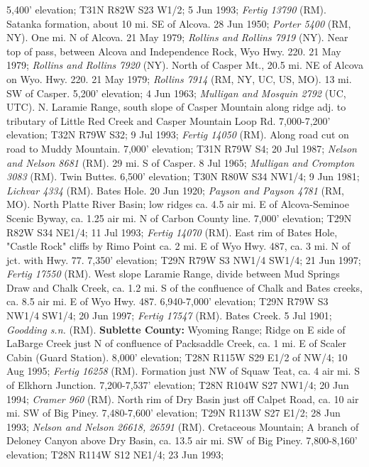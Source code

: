 5,400’ elevation; T31N R82W S23 W1/2; 5 Jun 1993; \textit{Fertig 13790} (RM).
Satanka formation, about 10 mi. SE of Alcova. 28 Jun 1950;
\textit{Porter 5400} (RM, NY).
One mi. N of Alcova. 21 May 1979; \textit{Rollins and Rollins 7919} (NY).
Near top of pass, between Alcova and Independence Rock, Wyo Hwy. 220.
21 May 1979; \textit{Rollins and Rollins 7920} (NY).
North of Casper Mt., 20.5 mi. NE of Alcova on Wyo. Hwy. 220. 21 May 1979;
\textit{Rollins 7914} (RM, NY, UC, US, MO).
13 mi. SW of Casper. 5,200’ elevation; 4 Jun 1963;
\textit{Mulligan and Mosquin 2792} (UC, UTC).
N. Laramie Range, south slope of Casper Mountain along ridge adj. to tributary
of Little Red Creek and Casper Mountain Loop Rd. 7,000-7,200’ elevation;
T32N R79W S32; 9 Jul 1993; \textit{Fertig 14050} (RM).
Along road cut on road to Muddy Mountain. 7,000’ elevation; T31N R79W S4;
20 Jul 1987; \textit{Nelson and Nelson 8681} (RM).
29 mi. S of Casper. 8 Jul 1965; \textit{Mulligan and Crompton 3083} (RM).
Twin Buttes. 6,500’ elevation; T30N R80W S34 NW1/4; 9 Jun 1981;
\textit{Lichvar 4334} (RM).
Bates Hole. 20 Jun 1920; \textit{Payson and Payson 4781} (RM, MO).
North Platte River Basin; low ridges ca. 4.5 air mi. E of Alcova-Seminoe Scenic
Byway, ca. 1.25 air mi. N of Carbon County line. 7,000’ elevation;
T29N R82W S34 NE1/4; 11 Jul 1993; \textit{Fertig 14070} (RM).
East rim of Bates Hole, "Castle Rock" cliffs by Rimo Point ca. 2 mi. E of Wyo
Hwy. 487, ca. 3 mi. N of jct. with Hwy. 77. 7,350’ elevation; T29N R79W S3
NW1/4 SW1/4; 21 Jun 1997; \textit{Fertig 17550} (RM).
West slope Laramie Range, divide between Mud Springs Draw and Chalk Creek,
ca. 1.2 mi. S of the confluence of Chalk and Bates creeks, ca. 8.5 air mi. E of
Wyo Hwy. 487. 6,940-7,000' elevation; T29N R79W S3 NW1/4 SW1/4; 20 Jun 1997;
\textit{Fertig 17547} (RM).
Bates Creek. 5 Jul 1901; \textit{Goodding s.n.} (RM).
  \textbf{Sublette County:}
Wyoming Range; Ridge on E side of LaBarge Creek just N of confluence of
Packsaddle Creek, ca. 1 mi. E of Scaler Cabin (Guard Station).
8,000’ elevation; T28N R115W S29 E1/2 of NW/4; 10 Aug 1995;
\textit{Fertig 16258} (RM).
Formation just NW of Squaw Teat, ca. 4 air mi. S of Elkhorn Junction.
7,200-7,537' elevation; T28N R104W S27 NW1/4; 20 Jun 1994;
\textit{Cramer 960} (RM).
North rim of Dry Basin just off Calpet Road, ca. 10 air mi. SW of Big Piney.
7,480-7,600’ elevation; T29N R113W S27 E1/2; 28 Jun 1993;
\textit{Nelson and Nelson 26618, 26591} (RM).
Cretaceous Mountain; A branch of Deloney Canyon above Dry Basin, ca. 13.5 air
mi. SW of Big Piney. 7,800-8,160’ elevation; T28N R114W S12 NE1/4; 23 Jun 1993;
